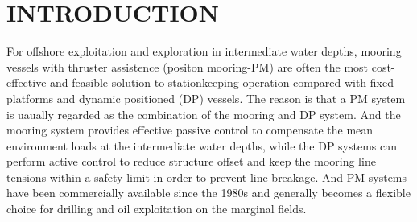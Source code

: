 \begin{sloppypar}
\begin{abstract}
\end{abstract}

\section{INTRODUCTION}
\label{sec:intro}

For offshore exploitation and exploration in intermediate water depths, mooring vessels with thruster assistence (positon mooring-PM) are often the most cost-effective and feasible solution to stationkeeping operation compared with fixed platforms and dynamic positioned (DP) vessels\cite{nguyen2009switching}. The reason is that a PM system is uaually regarded as the combination of the mooring and DP system. And the mooring system provides effective passive control to compensate the mean environment loads at the intermediate water depths, while the DP systems can perform active control to reduce structure offset and keep the mooring line tensions within a safety limit in order to prevent line breakage. And PM systems have been commercially available since the 1980s and generally becomes a flexible choice for drilling and oil exploitation on the marginal fields\cite{sorensen2011survey}.




\end{sloppypar}
